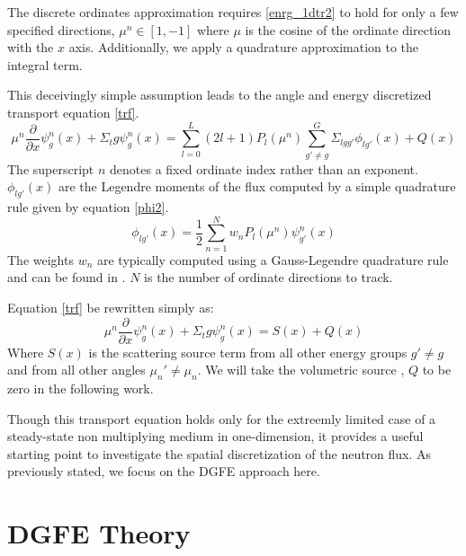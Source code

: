 The discrete ordinates approximation requires \ref{enrg_1dtr2} to hold for only a few specified directions, $\mu^n \in [1, -1]$ where $\mu$ is the cosine of the ordinate direction with the $x$ axis.  Additionally, we apply a quadrature approximation to the integral term.

This deceivingly simple assumption leads to the angle and energy discretized transport equation \ref{trf}.
\begin{equation}
\mu^n \frac{\partial}{\partial x} \psi^n_{g}(x) + \Sigma_tg \psi^n_g(x) =
\sum_{l=0}^L (2l+1) P_l(\mu^n) 
\sum_{g'\neq g}^G \Sigma_{lgg'} \phi_{lg'}(x)
 + Q(x)
\label{trf}
\end{equation}
The superscript $n$ denotes a fixed ordinate index rather than an exponent.
$\phi_{lg'}(x)$ are the Legendre moments of the flux computed by a simple quadrature rule given by equation \ref{phi2}.
\begin{equation}
\phi_{lg'}(x) = \frac{1}{2}\sum_{n=1}^N w_n P_l(\mu^n)\psi^n_{g'}(x)
\label{phi2}
\end{equation}
The weights $w_n$ are typically computed using a Gauss-Legendre quadrature rule and can be found in \cite{Lewis}.  $N$ is the number of ordinate directions to track.

Equation \ref{trf} be rewritten simply as:
\begin{equation}
\mu^n \frac{\partial}{\partial x} \psi^n_{g}(x) + \Sigma_tg \psi^n_g(x) = S(x) + Q(x)
\end{equation}
Where $S(x)$ is the scattering source term from all other energy groups $g' \neq g$ and from all other angles $\mu_n' \ne \mu_n$.  We will take the volumetric source , $Q$ to be zero in the following work.

Though this transport equation holds only for the extreemly limited case of a steady-state non multiplying medium in one-dimension, it provides a useful starting point to investigate the spatial discretization of the neutron flux.
As previously stated, we focus on the DGFE approach here.

\section{DGFE Theory}
